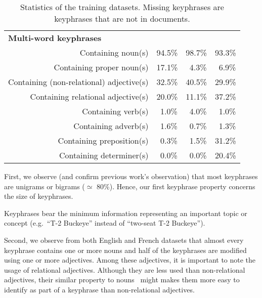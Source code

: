 \begin{table}
\begin{tabular}{lr|ccc}
        \hline
        \multicolumn{2}{l|}{\textbf{Multi-word keyphrases}}\\
        \multicolumn{2}{r|}{Containing noun(s)} & 94.5\% & 98.7\% & 93.3\%\\
        \multicolumn{2}{r|}{Containing proper noun(s)} & 17.1\% & $~~$4.3\% & $~~$6.9\%\\
        \multicolumn{2}{r|}{Containing (non-relational) adjective(s)} & 32.5\% & 40.5\% & 29.9\%\\
        \multicolumn{2}{r|}{Containing relational adjective(s)} & 20.0\% & 11.1\% & 37.2\%\\
        \multicolumn{2}{r|}{Containing verb(s)} & $~~$1.0\% & $~~$4.0\% & $~~$1.0\%\\
        \multicolumn{2}{r|}{Containing adverb(s)} & $~~$1.6\% & $~~$0.7\% & $~~$1.3\%\\
        \multicolumn{2}{r|}{Containing preposition(s)} & $~~$0.3\% & $~~$1.5\% & 31.2\%\\
        \multicolumn{2}{r|}{Containing determiner(s)} & $~~$0.0\% & $~~$0.0\% & 20.4\%\\
        \bottomrule
      \end{tabular}
      \caption{Statistics of the training datasets. Missing keyphrases are
               keyphrases that are not in documents.
               \label{tab:train_dataset_statistics}}
    \end{table}

    First, we observe (and confirm previous work's observation) that most
    keyphrases are unigrams or bigrams ($\simeq$ 80\%). Hence, our first
    keyphrase property concerns the size of keyphrases.
    
    \begin{property}\label{prop:informativity}
      Keyphrases bear the minimum information representing an important topic or
      concept (e.g.~``T-2 Buckeye'' instead of ``two-seat T-2 Buckeye'').
    \end{property}

    Second, we observe from both English and French datasets that almost every
    keyphrase contains one or more nouns and half of the keyphrases are modified
    using one or more adjectives.
    Among these adjectives, it is important to note the usage of relational
    adjectives. Although they are less used than non-relational adjectives,
    their similar property to
    nouns~\cite{bally1944linguistiquegeneraleetlinguistiquefrancaise} might
    makes them more easy to identify as part of a keyphrase than non-relational
    adjectives.

